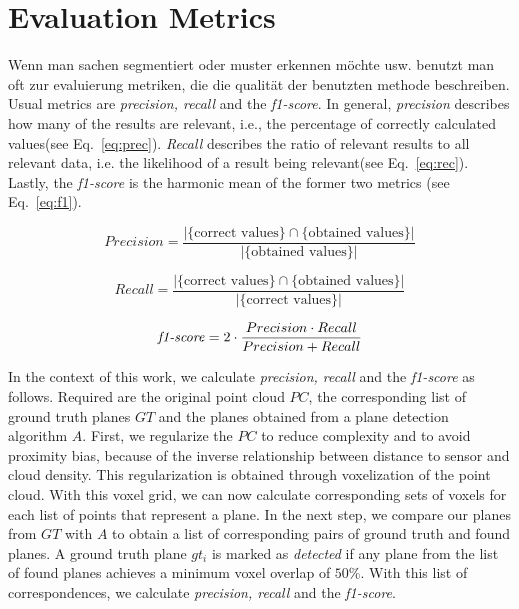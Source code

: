\documentclass[main.tex]{subfiles}
\begin{document}
\section{Evaluation Metrics}
\label{sec:metrics}
Wenn man sachen segmentiert oder muster erkennen möchte usw. benutzt man oft zur evaluierung metriken, die die qualität der benutzten methode beschreiben.
Usual metrics are \textit{precision, recall} and the \textit{f1-score}.
In general, \textit{precision} describes how many of the results are relevant, i.e., the percentage of correctly calculated values(see Eq.~\ref{eq:prec}). \textit{Recall} describes the ratio of relevant results to all relevant data, i.e.
the likelihood of a result being relevant(see Eq.~\ref{eq:rec}). Lastly, the \textit{f1-score} is the harmonic mean of the former two metrics (see Eq.~\ref{eq:f1}).

\begin{equation}
    Precision = \frac{|\{\text{correct values}\} \cap \{\text{obtained values}\}|}{|\{\text{obtained values}\}|}
    \label{eq:prec}
\end{equation}

\begin{equation}
    Recall = \frac{|\{\text{correct values}\} \cap \{\text{obtained values}\}|}{|\{\text{correct values}\}|}
    \label{eq:rec}
\end{equation}

\begin{equation}
    \text{\textit{f1-score}} = 2 \cdot\frac{Precision\cdot Recall}{Precision + Recall}
    \label{eq:f1}
\end{equation}



In the context of this work, we calculate \textit{precision, recall} and the \textit{f1-score} as follows.
Required are the original point cloud $PC$, the corresponding list of ground truth planes $GT$ and the planes obtained from a plane detection algorithm $A$.
First, we regularize the $PC$ to reduce complexity and to avoid proximity bias, because of the inverse relationship
between distance to sensor and cloud density. This regularization is obtained through voxelization of the point cloud.
With this voxel grid, we can now calculate corresponding sets of voxels for each list of points that represent a plane.
In the next step, we compare our planes from $GT$ with $A$ to obtain a list of corresponding pairs of ground truth and found planes.
A ground truth plane $gt_i$ is marked as \textit{detected} if any plane from the list of found planes achieves a minimum voxel overlap of $50\%$.
With this list of correspondences, we calculate \textit{precision, recall} and the \textit{f1-score}.
\end{document}
